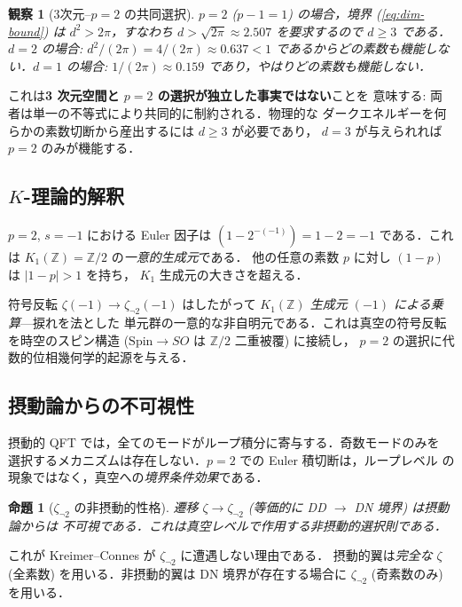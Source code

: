 \documentclass[11pt,a4paper]{article}
\newtheorem{proposition}{命題}
\newtheorem{observation}{観察}
\begin{document}
\begin{observation}[3次元--$p{=}2$ の共同選択]
$p = 2$ ($p - 1 = 1$) の場合，境界 (\ref{eq:dim-bound}) は
$d^2 > 2\pi$，すなわち $d > \sqrt{2\pi} \approx 2.507$ を要求するので
$d \geq 3$ である．$d = 2$ の場合: $d^2/(2\pi) = 4/(2\pi) \approx 0.637 < 1$
であるから\emph{どの素数も機能しない}．$d = 1$ の場合:
$1/(2\pi) \approx 0.159$ であり，やはりどの素数も機能しない．
\end{observation}

これは\textbf{3 次元空間と $p = 2$ の選択が独立した事実ではない}ことを
意味する: 両者は単一の不等式により共同的に制約される．物理的な
ダークエネルギーを何らかの素数切断から産出するには $d \geq 3$ が必要であり，
$d = 3$ が与えられれば $p = 2$ のみが機能する．

\subsection{$K$-理論的解釈}

$p = 2$, $s = -1$ における Euler 因子は $(1 - 2^{-(-1)}) = 1 - 2 = -1$
である．これは $K_1(\mathbb{Z}) = \mathbb{Z}/2$ の\emph{一意的生成元}である．
他の任意の素数 $p$ に対し $(1 - p)$ は $|1 - p| > 1$ を持ち，
$K_1$ 生成元の大きさを超える．

符号反転 $\zeta(-1) \to \zeta_{\neg 2}(-1)$ はしたがって
\emph{$K_1(\mathbb{Z})$ 生成元 $(-1)$ による乗算}---捩れを法とした
単元群の一意的な非自明元である．これは真空の符号反転を時空のスピン構造
($\text{Spin} \to SO$ は $\mathbb{Z}/2$ 二重被覆) に接続し，
$p = 2$ の選択に代数的位相幾何学的起源を与える．

\subsection{摂動論からの不可視性}

摂動的 QFT では，全てのモードがループ積分に寄与する．奇数モードのみを
選択するメカニズムは存在しない．$p = 2$ での Euler 積切断は，ループレベル
の現象ではなく，真空への\emph{境界条件効果}である．

\begin{proposition}[$\zeta_{\neg 2}$ の非摂動的性格]
遷移 $\zeta \to \zeta_{\neg 2}$ (等価的に DD $\to$ DN 境界) は摂動論からは
不可視である．これは真空レベルで作用する非摂動的選択則である．
\end{proposition}

これが Kreimer--Connes が $\zeta_{\neg 2}$ に遭遇しない理由である．
摂動的翼は\emph{完全な} $\zeta$ (全素数) を用いる．非摂動的翼は DN
境界が存在する場合に $\zeta_{\neg 2}$ (奇素数のみ) を用いる．
\end{document}
